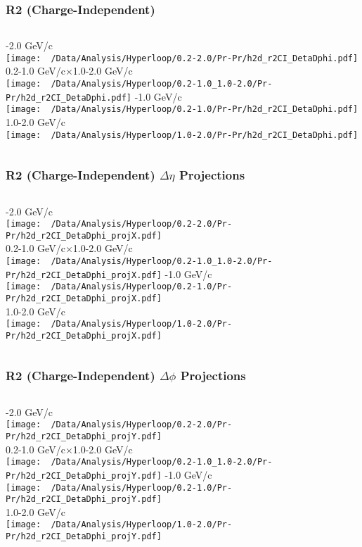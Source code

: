 \documentclass{beamer}
\begin{document}
\begin{frame}
	\frametitle{R2 (Charge-Independent)}
	\begin{columns}
		-2.0 GeV/c\\
		\texttt{[image: ~/Data/Analysis/Hyperloop/0.2-2.0/Pr-Pr/h2d\_r2CI\_DetaDphi.pdf]}\\0.2-1.0 GeV/c$\times$1.0-2.0 GeV/c\\
		\texttt{[image: ~/Data/Analysis/Hyperloop/0.2-1.0\_1.0-2.0/Pr-Pr/h2d\_r2CI\_DetaDphi.pdf]}
		-1.0 GeV/c\\
		\texttt{[image: ~/Data/Analysis/Hyperloop/0.2-1.0/Pr-Pr/h2d\_r2CI\_DetaDphi.pdf]}\\1.0-2.0 GeV/c\\
		\texttt{[image: ~/Data/Analysis/Hyperloop/1.0-2.0/Pr-Pr/h2d\_r2CI\_DetaDphi.pdf]}
	\end{columns}
\end{frame}
\begin{frame}
	\frametitle{R2 (Charge-Independent) $\Delta\eta$ Projections}
	\begin{columns}
		\column{0.5\textwidth}
		-2.0 GeV/c\\
		\texttt{[image: ~/Data/Analysis/Hyperloop/0.2-2.0/Pr-Pr/h2d\_r2CI\_DetaDphi\_projX.pdf]}\\0.2-1.0 GeV/c$\times$1.0-2.0 GeV/c\\
		\texttt{[image: ~/Data/Analysis/Hyperloop/0.2-1.0\_1.0-2.0/Pr-Pr/h2d\_r2CI\_DetaDphi\_projX.pdf]}
		\column{0.5\textwidth}
		-1.0 GeV/c\\
		\texttt{[image: ~/Data/Analysis/Hyperloop/0.2-1.0/Pr-Pr/h2d\_r2CI\_DetaDphi\_projX.pdf]}\\1.0-2.0 GeV/c\\
		\texttt{[image: ~/Data/Analysis/Hyperloop/1.0-2.0/Pr-Pr/h2d\_r2CI\_DetaDphi\_projX.pdf]}
	\end{columns}
\end{frame}
\begin{frame}
	\frametitle{R2 (Charge-Independent) $\Delta\phi$ Projections}
	\begin{columns}
		-2.0 GeV/c\\
		\texttt{[image: ~/Data/Analysis/Hyperloop/0.2-2.0/Pr-Pr/h2d\_r2CI\_DetaDphi\_projY.pdf]}\\0.2-1.0 GeV/c$\times$1.0-2.0 GeV/c\\
		\texttt{[image: ~/Data/Analysis/Hyperloop/0.2-1.0\_1.0-2.0/Pr-Pr/h2d\_r2CI\_DetaDphi\_projY.pdf]}
		-1.0 GeV/c\\
		\texttt{[image: ~/Data/Analysis/Hyperloop/0.2-1.0/Pr-Pr/h2d\_r2CI\_DetaDphi\_projY.pdf]}\\1.0-2.0 GeV/c\\
		\texttt{[image: ~/Data/Analysis/Hyperloop/1.0-2.0/Pr-Pr/h2d\_r2CI\_DetaDphi\_projY.pdf]}
	\end{columns}
\end{frame}
\end{document}
